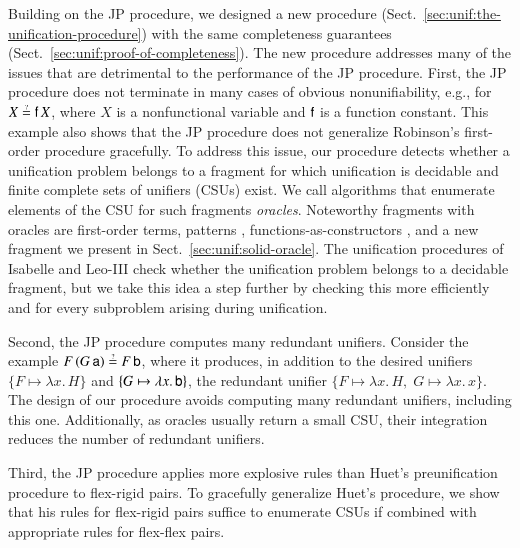 Building on the JP procedure, we designed a new procedure (Sect.~\ref{sec:unif:the-unification-procedure}) with the same completeness guarantees (Sect.~\ref{sec:unif:proof-of-completeness}).
The new procedure addresses many of the issues that are
detrimental to the performance of the JP procedure.
%
First, the JP procedure does not terminate in many cases of obvious
nonunifiability, e.g., for $X \unif \cst{f} \, X$, where $X$ is a nonfunctional
variable and $\mathsf{f}$ is a function constant. This example also shows that
the JP procedure does not generalize Robinson's first-order procedure gracefully. To address
this issue, our procedure detects whether a unification problem belongs to a
fragment for which unification is decidable and finite complete sets of unifiers (CSUs)
exist.
We call algorithms that enumerate elements of the CSU for such fragments
\emph{oracles}. Noteworthy fragments with oracles are first-order terms,
patterns \cite{tn-93-patterns}, functions-as-constructors
\cite{tl-16-facunif}, and a new fragment 
we present in Sect.~\ref{sec:unif:solid-oracle}.
%
The unification procedures of Isabelle and Leo-III check whether the unification
problem belongs to a decidable fragment, but we take this idea a step further by
checking this more efficiently and for every subproblem arising during
unification.

Second, the JP procedure computes many redundant unifiers. Consider the
example $F \, (G \, \cst{a}) \unif F \, \cst{b}$, where it produces, in addition
to the desired unifiers $\{F \mapsto \lambda x. \, H\}$ and $\{G \mapsto \lambda
x. \, \mathsf{b}\}$, the redundant unifier $\{F \mapsto \lambda x. \, H,\; G \mapsto
\lambda x. \, x\}$. 
The design of our procedure avoids computing many redundant unifiers, including
this one. Additionally, as oracles usually return a small CSU, 
their integration reduces the number of redundant unifiers.

\newpage
Third, the JP procedure applies more explosive rules than Huet's preunification procedure to
flex-rigid pairs. To gracefully generalize Huet's procedure, 
we show that his rules for flex-rigid pairs suffice 
to enumerate CSUs
if combined with appropriate rules for flex-flex pairs.

